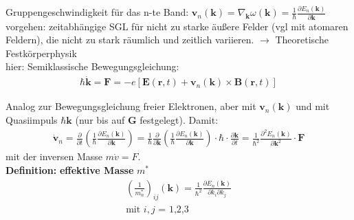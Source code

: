 \begin{itemize}
          Gruppengeschwindigkeit für das n-te Band: $\textbf{v}_n(\textbf{k}) = \nabla_\textbf{k} \omega(\textbf{k}) = \frac{1}{\hbar} \frac{\partial E_n(\textbf{k})}{\partial \textbf{k}} $ \\
          vorgehen: zeitabhängige SGL für nicht zu starke äußere Felder (vgl mit atomaren Feldern), die nicht zu stark räumlich und zeitlich variieren. $\rightarrow$ Theoretische Festkörperphysik \\
          hier: Semiklassische Bewegungsgleichung:
          \begin{align}
              \hbar \dot{\textbf{k}} = \textbf{F} = -e\left[\textbf{E}(\textbf{r},t) + \textbf{v}_n(\textbf{k}) \times \textbf{B}(\textbf{r},t)\right]
          \end{align}

          Analog zur Bewegungsgleichung freier Elektronen, aber mit $\textbf{v}_n(\textbf{k})$ und mit Quasiimpuls $\hbar \textbf{k}$ (nur bis auf $\textbf{G}$ festgelegt). Damit:
          \begin{align}
              \dot{\textbf{v}}_n = \frac{\partial}{\partial t} \left( \frac{1}{\hbar} \frac{\partial E_n(\textbf{k})}{\partial \textbf{k}} \right) =  \frac{1}{\hbar} \frac{\partial}{\partial \textbf{k}} \left( \frac{1}{\hbar} \frac{\partial E_n(\textbf{k})}{\partial \textbf{k}} \right) \cdot \hbar \cdot \frac{\partial \textbf{k}}{\partial t} = \frac{1}{\hbar^2} \frac{\partial^2 E_n(\textbf{k})}{\partial \textbf{k}^2} \cdot \textbf{F}
          \end{align}
          mit der inversen Masse $m\dot{v} = F$. \\
          \textbf{Definition:} \textbf{effektive Masse} $m^*$
          \begin{align*}
              \left(\frac{1}{m^*_n}\right)_{ij} (\textbf{k}) = \frac{1}{\hbar^2}\frac{\partial E_n(\textbf{k})}{\partial k_i\partial k_j} \\
              \text{mit $i,j$ = 1,2,3}
          \end{align*}


\end{itemize}
